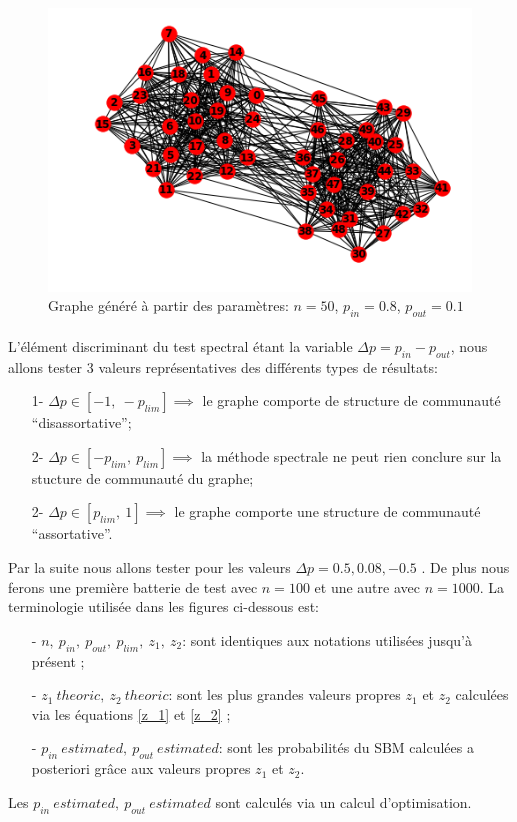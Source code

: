 \begin{figure}[H]
\centering
\includegraphics[scale=0.6]{static/graph_n50_pin08_pout01.png}
\caption{Graphe généré à partir des paramètres: $n=50$, $p_{in}=0.8$, $p_{out}=0.1$}
\end{figure}

\paragraph{ }\label{par: p_lim law}
L'élément discriminant du test spectral étant la variable $ \Delta p= p_{in} - p_{out}$, nous allons tester 3 valeurs représentatives des différents types de résultats:
\begin{itemize}
	\item[1-] $\Delta p \in [-1,\: -p_{lim}] \implies$ le graphe comporte de structure de communauté ``disassortative'';
	\item[2-] $\Delta p \in [-p_{lim},\: p_{lim}] \implies$ la méthode spectrale ne peut rien conclure sur la stucture de communauté du graphe;
	\item[2-] $\Delta p \in [p_{lim},\: 1] \implies$ le graphe comporte une structure de communauté ``assortative''.\\
\end{itemize}

Par la suite nous allons tester pour les valeurs $\Delta p= 0.5, 0.08, -0.5$ .
De plus nous ferons une première batterie de test avec $n=100$ et une autre avec $n=1000$.
La terminologie utilisée dans les figures ci-dessous est:
\begin{itemize} 
	\item[- \underline{$n,\: p_{in},\: p_{out},\: p_{lim},\: z_1,\: z_2$}:] sont identiques aux notations utilisées jusqu'à présent ;
	\item[- \underline{$z_1\: theoric, \:z_2\: theoric$}:] sont les plus grandes valeurs propres $z_1$ et $z_2$ calculées via les équations \eqref{z_1} et \eqref{z_2} ;    
	\item[- \underline{$p_{in}\: estimated, \:p_{out}\: estimated$}:] sont les probabilités du SBM calculées a posteriori grâce aux valeurs propres $z_1$ et $z_2$.\\
\end{itemize}
Les $p_{in}\: estimated, \:p_{out}\: estimated$ sont calculés via un calcul d'optimisation.\\


